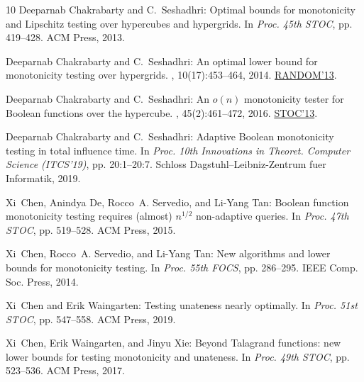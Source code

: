 \documentclass[11pt]{article}
\numberwithin{equation}{section}
\theoremstyle{definition}
\theoremstyle{plain}
\begin{document}
\begin{thebibliography}{10}
{\sc Deeparnab Chakrabarty and C.~Seshadhri}: Optimal bounds for monotonicity
  and {Lipschitz} testing over hypercubes and hypergrids.
\newblock In {\em Proc. 45th STOC}, pp. 419--428. ACM Press, 2013.

{\sc Deeparnab Chakrabarty and C.~Seshadhri}: An optimal lower bound for
  monotonicity testing over hypergrids.
, 10(17):453--464, 2014.
\newblock \prelim
  \href{https://doi.org/10.1007/978-3-642-40328-6\_30}{RANDOM'13}.

{\sc Deeparnab Chakrabarty and C.~Seshadhri}: An $o(n)$ monotonicity tester for
  {Boolean} functions over the hypercube.
, 45(2):461--472, 2016.
\newblock \prelim \href{https://doi.org/10.1145/2488608.2488660}{STOC'13}.

{\sc Deeparnab Chakrabarty and C.~Seshadhri}: Adaptive {Boolean} monotonicity
  testing in total influence time.
\newblock In {\em Proc. 10th Innovations in Theoret. Computer Science
  (ITCS'19)}, pp. 20:1--20:7. Schloss Dagstuhl--Leibniz-Zentrum fuer
  Informatik, 2019.

{\sc Xi~Chen, Anindya De, Rocco~A. Servedio, and Li{-}Yang Tan}: Boolean
  function monotonicity testing requires (almost) $n^{1/2}$ non-adaptive
  queries.
\newblock In {\em Proc. 47th STOC}, pp. 519--528. ACM Press, 2015.

{\sc Xi~Chen, Rocco~A. Servedio, and Li{-}Yang Tan}: New algorithms and lower
  bounds for monotonicity testing.
\newblock In {\em Proc. 55th FOCS}, pp. 286--295. IEEE Comp. Soc. Press, 2014.

{\sc Xi~Chen and Erik Waingarten}: Testing unateness nearly optimally.
\newblock In {\em Proc. 51st STOC}, pp. 547--558. ACM Press, 2019.

{\sc Xi~Chen, Erik Waingarten, and Jinyu Xie}: Beyond {Talagrand} functions:
  new lower bounds for testing monotonicity and unateness.
\newblock In {\em Proc. 49th STOC}, pp. 523--536. ACM Press, 2017.


\end{thebibliography}
\end{document}

